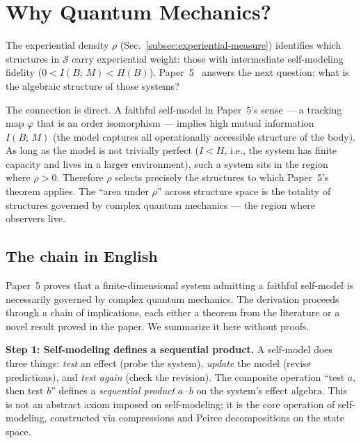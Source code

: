 
\section{Why Quantum Mechanics?}
\label{sec:why-qm}

The experiential density $\rho$
(Sec.~\ref{subsec:experiential-measure}) identifies which structures
in $\mathcal{S}$ carry experiential weight: those with intermediate
self-modeling fidelity ($0 < I(B;\,M) < H(B)$).
Paper~5~\citep{ehrlich2026qm} answers the next question: what is the
algebraic structure of those systems?

The connection is direct.  A faithful self-model in Paper~5's sense
--- a tracking map $\varphi$ that is an order isomorphism --- implies
high mutual information $I(B;\,M)$ (the model captures all
operationally accessible structure of the body).  As long as the model
is not trivially perfect ($I < H$, i.e., the system has finite
capacity and lives in a larger environment), such a system sits in the
region where $\rho > 0$.  Therefore $\rho$ selects precisely the
structures to which Paper~5's theorem applies.  The ``area under
$\rho$'' across structure space is the totality of structures governed
by complex quantum mechanics --- the region where observers live.

\subsection{The chain in English}
\label{subsec:chain-english}

Paper~5 proves that a finite-dimensional system
admitting a faithful self-model is necessarily governed by complex
quantum mechanics.  The derivation proceeds through a chain of
implications, each either a theorem from the literature or a novel
result proved in the paper.  We summarize it here without proofs.

\textbf{Step 1: Self-modeling defines a sequential product.}  A
self-model does three things: \emph{test} an effect (probe the
system), \emph{update} the model (revise predictions), and \emph{test
again} (check the revision).  The composite operation ``test $a$, then
test $b$'' defines a \emph{sequential product} $a \cdot b$ on the
system's effect algebra.  This is not an abstract axiom imposed on
self-modeling; it is the core operation of self-modeling, constructed
via compressions and Peirce decompositions on the state space.


